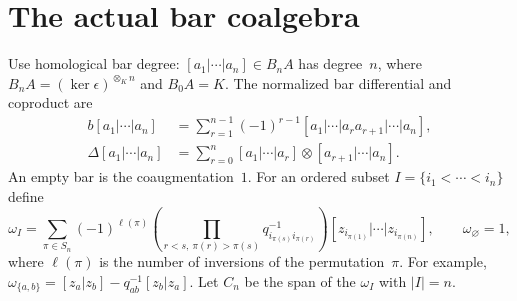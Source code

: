 \section{The actual bar coalgebra}
Use homological bar degree: $[a_1|\cdots|a_n]\in B_nA$ has degree~$n$,
where $B_nA=(\ker\epsilon)^{\otimes_K n}$ and $B_0A=K$.
The normalized bar differential and coproduct are
\[
 \begin{split}
 b[a_1|\cdots|a_n]
   &=\sum_{r=1}^{n-1}(-1)^{r-1}
       [a_1|\cdots|a_ra_{r+1}|\cdots|a_n],\\
 \Delta[a_1|\cdots|a_n]
   &=\sum_{r=0}^n[a_1|\cdots|a_r]\otimes[a_{r+1}|\cdots|a_n].
 \end{split}
\]
An empty bar is the coaugmentation~$1$.
For an ordered subset $I=\{i_1<\cdots<i_n\}$ define
\begin{equation}\label{cbc:zf:bar-cycles}
 \omega_I=\sum_{\pi\in S_n}(-1)^{\ell(\pi)}
   \left(\prod_{r<s,\ \pi(r)>\pi(s)}
                     q_{i_{\pi(s)}i_{\pi(r)}}^{-1}\right)
     [z_{i_{\pi(1)}}|\cdots|z_{i_{\pi(n)}}],
 \qquad \omega_\varnothing=1,
\end{equation}
where $\ell(\pi)$ is the number of inversions of the permutation~$\pi$.
For example, $\omega_{\{a,b\}}=[z_a|z_b]-q_{ab}^{-1}[z_b|z_a]$.
Let $C_n$ be the span of the $\omega_I$ with $|I|=n$.


